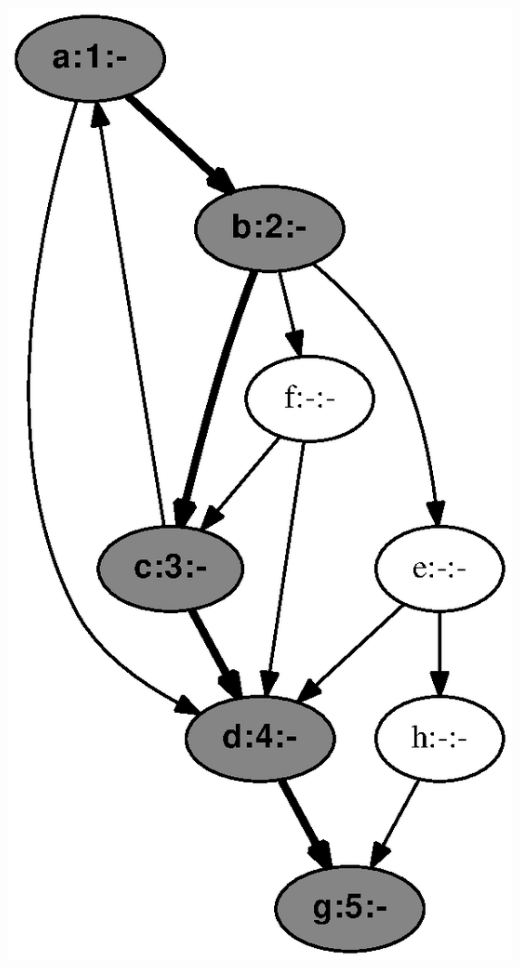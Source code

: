 \documentclass{article}
\begin{document}
\includegraphics[height=.3\textheight]{dfs_directed_classroom_05.eps}
\vspace{1em}
\end{document}
